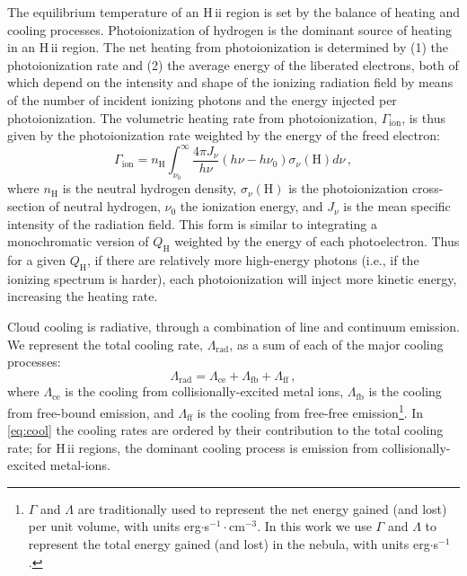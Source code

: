 \documentclass[trackchanges, twocolumn, tighten]{aastex61}
\newcommand{\Eq}[1]{\autoref{eq:#1}}
\newcommand{\hii}{H\,{\sc ii}\xspace}
\newcommand{\nH}{\ensuremath{n_{\mathrm{H}}}}
\newcommand{\QH}{\ensuremath{Q_{\mathrm{H}}}}
\newcommand{\Heat}{\ensuremath{\Gamma_{\mathrm{ion}}}}
\newcommand{\Cool}{\ensuremath{\Lambda_{\mathrm{rad}}}}
\begin{document}
The equilibrium temperature of an \hii region is set by the balance of heating and cooling processes. Photoionization of hydrogen is the dominant source of heating in an \hii region. The net heating from photoionization is determined by (1) the photoionization rate and (2) the average energy of the liberated electrons, both of which depend on the intensity and shape of the ionizing radiation field by means of the number of incident ionizing photons and the energy injected per photoionization. The volumetric heating rate from photoionization, \Heat{}, is thus given by the photoionization rate weighted by the energy of the freed electron:
\begin{equation}\label{eq:heat}
    \Gamma_{\mathrm{ion}} = \nH{} \int_{\nu_0}^{\infty} \frac{4 \pi J_{\nu}}{h\nu} (h \nu - h \nu_0) \sigma_{\nu}(\mathrm{H}) d\nu \,,
\end{equation}
where \nH{} is the neutral hydrogen density, $\sigma_{\nu}(\mathrm{H})$ is the photoionization cross-section of neutral hydrogen, $\nu_0$ the ionization energy,  and $J_{\nu}$ is the mean specific intensity of the radiation field. This form is similar to integrating a monochromatic version of \QH{} weighted by the energy of each photoelectron. Thus for a given \QH{}, if there are relatively more high-energy photons (i.e., if the ionizing spectrum is harder), each photoionization will inject more kinetic energy, increasing the heating rate.

Cloud cooling is radiative, through a combination of line and continuum emission. We represent the total cooling rate, \Cool{}, as a sum of each of the major cooling processes:
\begin{equation}\label{eq:cool}
    \Lambda_{\mathrm{rad}} = \Lambda_{\mathrm{ce}} + \Lambda_{\mathrm{fb}} + \Lambda_{\mathrm{ff}} \, ,
\end{equation}
where $\Lambda_{\mathrm{ce}}$ is the cooling from collisionally-excited metal ions, $\Lambda_{\mathrm{fb}}$ is the cooling from free-bound emission, and $\Lambda_{\mathrm{ff}}$ is the cooling from free-free emission\footnote{$\Gamma$ and $\Lambda$ are traditionally used to represent the net energy gained (and lost) per unit volume, with units erg$\cdot$s$^{-1}\cdot$cm$^{-3}$. In this work we use $\Gamma$ and $\Lambda$ to represent the total energy gained (and lost) in the nebula, with units erg$\cdot$s$^{-1}$.}. In \Eq{cool} the cooling rates are ordered by their contribution to the total cooling rate; for \hii regions, the dominant cooling process is emission from collisionally-excited metal-ions.
\end{document}
